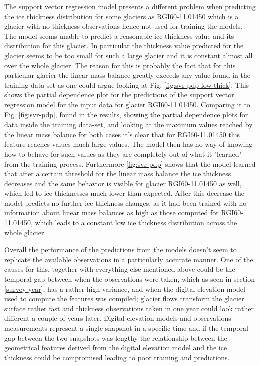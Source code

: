 The support vector regression model presents a different problem when predicting the ice thickness distribution for some glaciers as RGI60-11.01450 which is a glacier with no thickness observations hence not used for training the models. The model seems unable to predict a reasonable ice thickness value and its distribution for this glacier. In particular the thickness value predicted for the glacier seems to be too small for such a large glacier and it is constant almost all over the whole glacier. The reason for this is probably the fact that for this particular glacier the linear mass balance greatly exceeds any value found in the training data-set as one could argue looking at Fig. \ref{fig:svr-pdp-low-thick}. This shows the partial dependence plot for the predictions of the support vector regression model for the input data for glacier RGI60-11.01450. Comparing it to Fig. \ref{fig:svr-pdp}, found in the results, showing the partial dependence plots for data inside the training data-set, and looking at the maximum values reached by  the linear mass balance for both cases it's clear that for RGI60-11.01450 this feature reaches values much large values. The model then has no way of knowing how to behave for such values as they are completely out of what it "learned" from the training process. Furthermore \ref{fig:svr-pdp} shows that the model learned that after a certain threshold for the linear mass balance the ice thickness decreases and the same behavior is visible for glacier RGI60-11.01450 as well, which led to ice thicknesses much lower than expected. After this decrease the model predicts no further ice thickness changes, as it had been trained with no information about linear mass balances as high as those computed for RGI60-11.01450, which leads to a constant low ice thickness distribution across the whole glacier.

Overall the performance of the predictions from the models doesn't seem to replicate the available observations in a particularly accurate manner. One of the causes for this, together with everything else mentioned above could be the temporal gap between when the observations were taken, which as seen in section \ref{survey-year}, has a rather high variance, and when the digital elevation model used to compute the features was compiled; glacier flows transform the glacier surface rather fast and thickness observations taken in one year could look rather different a couple of years later. Digital elevation models and observations measurements represent a single snapshot in a specific time and if the temporal gap between the two snapshots was lengthy the relationship between the geometrical features derived from the digital elevation model and the ice thickness could be compromised leading to poor training and predictions.

